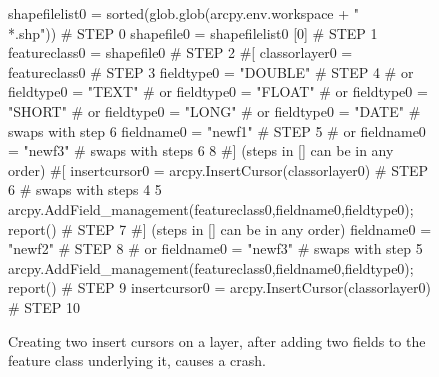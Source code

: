 \begin{figure}
{\scriptsize 
\begin{code}
shapefilelist0 = sorted(glob.glob(arcpy.env.workspace + "\\*.shp"))                   \# STEP 0
shapefile0 = shapefilelist0 [0]                                                      \# STEP 1
featureclass0 = shapefile0                                                           \# STEP 2
\#[
classorlayer0 = featureclass0                                                        \# STEP 3
fieldtype0 = "DOUBLE"                                                                \# STEP 4
\#  or fieldtype0 = "TEXT"
\#  or fieldtype0 = "FLOAT"
\#  or fieldtype0 = "SHORT"
\#  or fieldtype0 = "LONG"
\#  or fieldtype0 = "DATE"
\#  swaps with step 6
fieldname0 = "newf1"                                                                 \# STEP 5
\#  or fieldname0 = "newf3"
\#  swaps with steps 6 8
\#] (steps in [] can be in any order)
\#[
insertcursor0 = arcpy.InsertCursor(classorlayer0)                                    \# STEP 6
\#  swaps with steps 4 5
arcpy.AddField\_management(featureclass0,fieldname0,fieldtype0); report()             \# STEP 7
\#] (steps in [] can be in any order)
fieldname0 = "newf2"                                                                 \# STEP 8
\#  or fieldname0 = "newf3"
\#  swaps with step 5
arcpy.AddField\_management(featureclass0,fieldname0,fieldtype0); report()             \# STEP 9
insertcursor0 = arcpy.InsertCursor(classorlayer0)                                    \# STEP 10
\end{code}
}
\caption{Creating two insert cursors on a layer, after adding two fields to the feature class underlying it, causes a crash.}
\label{fault3}
\end{figure}